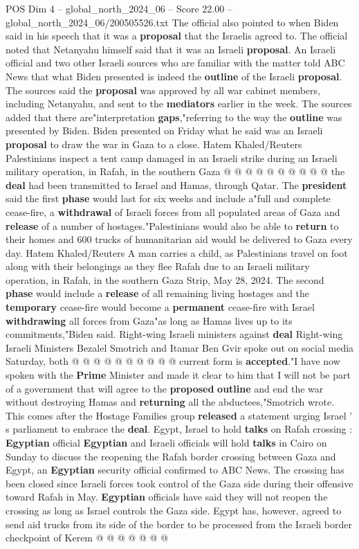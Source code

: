 \begin{textsample}{POS Dim 4 – global\_north\_2024\_06 – Score 22.00 – global\_north\_2024\_06/200505526.txt}
The official also pointed to when Biden said in his speech that it was a \textbf{proposal} that the Israelis agreed to.
The official noted that Netanyahu himself said that it was an Israeli \textbf{proposal}.
An Israeli official and two other Israeli sources who are familiar with the matter told ABC News that what Biden presented is indeed the \textbf{outline} of the Israeli \textbf{proposal}.
The sources said the \textbf{proposal} was approved by all war cabinet members, including Netanyahu, and sent to the \textbf{mediators} earlier in the week.
The sources added that there are"interpretation \textbf{gaps},"referring to the way the \textbf{outline} was presented by Biden.
Biden presented on Friday what he said was an Israeli \textbf{proposal} to draw the war in Gaza to a close.
Hatem Khaled/Reuters Palestinians inspect a tent camp damaged in an Israeli strike during an Israeli military operation, in Rafah, in the southern Gaza @ @ @ @ @ @ @ @ @ @ the \textbf{deal} had been transmitted to Israel and Hamas, through Qatar.
The \textbf{president} said the first \textbf{phase} would last for six weeks and include a"full and complete cease-fire, a \textbf{withdrawal} of Israeli forces from all populated areas of Gaza and \textbf{release} of a number of hostages."Palestinians would also be able to \textbf{return} to their homes and 600 trucks of humanitarian aid would be delivered to Gaza every day.
Hatem Khaled/Reuters A man carries a child, as Palestinians travel on foot along with their belongings as they flee Rafah due to an Israeli military operation, in Rafah, in the southern Gaza Strip, May 28, 2024.
The second \textbf{phase} would include a \textbf{release} of all remaining living hostages and the \textbf{temporary} cease-fire would become a \textbf{permanent} cease-fire with Israel \textbf{withdrawing} all forces from Gaza"as long as Hamas lives up to its commitments,"Biden said.
Right-wing Israeli ministers against \textbf{deal} Right-wing Israeli Ministers Bezalel Smotrich and Itamar Ben Gvir spoke out on social media Saturday, both @ @ @ @ @ @ @ @ @ @ current form is \textbf{accepted}."I have now spoken with the \textbf{Prime} Minister and made it clear to him that I will not be part of a government that will agree to the \textbf{proposed} \textbf{outline} and end the war without destroying Hamas and \textbf{returning} all the abductees,"Smotrich wrote.
This comes after the Hostage Families group \textbf{released} a statement urging Israel ' s parliament to embrace the \textbf{deal}.
Egypt, Israel to hold \textbf{talks} on Rafah crossing : \textbf{Egyptian} official \textbf{Egyptian} and Israeli officials will hold \textbf{talks} in Cairo on Sunday to discuss the reopening the Rafah border crossing between Gaza and Egypt, an \textbf{Egyptian} security official confirmed to ABC News.
The crossing has been closed since Israeli forces took control of the Gaza side during their offensive toward Rafah in May. \textbf{Egyptian} officials have said they will not reopen the crossing as long as Israel controls the Gaza side.
Egypt has, however, agreed to send aid trucks from its side of the border to be processed from the Israeli border checkpoint of Kerem @ @ @ @ @ @ @


\end{textsample}
